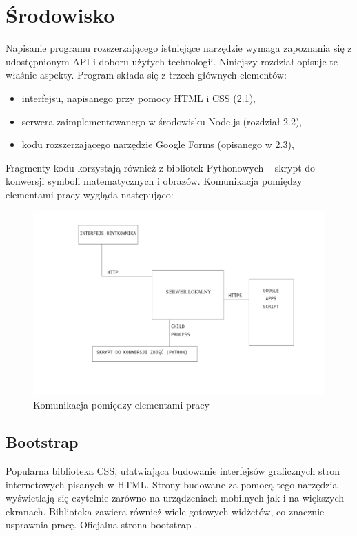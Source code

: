 \chapter{Środowisko} 
Napisanie programu rozszerzającego istniejące narzędzie wymaga zapoznania się z udostępnionym API i doboru użytych technologii. Niniejszy rozdział opisuje te właśnie aspekty.
\ind Program składa się z trzech głównych elementów:
\begin{itemize}
\item interfejsu, napisanego przy pomocy HTML i CSS (2.1),
\item serwera zaimplementowanego w środowisku Node.js (rozdział 2.2),
\item kodu rozszerzającego narzędzie Google Forms (opisanego w 2.3),
\end{itemize}
\ind Fragmenty kodu korzystają również z bibliotek Pythonowych -- skrypt do konwersji symboli matematycznych i obrazów.
\ind Komunikacja pomiędzy elementami pracy wygląda następująco:
\begin{figure}[H]
  \includegraphics[scale=0.75]{schemat.png}
  \caption{Komunikacja pomiędzy elementami pracy}
  \label{fig:1}
\end{figure}

\section{Bootstrap}  
Popularna biblioteka CSS, ułatwiająca budowanie interfejsów graficznych stron internetowych pisanych w HTML. Strony budowane za pomocą tego narzędzia wyświetlają się czytelnie zarówno na urządzeniach mobilnych jak i na większych ekranach. Biblioteka zawiera również wiele gotowych widżetów, co znacznie usprawnia pracę.
Oficjalna strona bootstrap \cite{bootstrap}.



